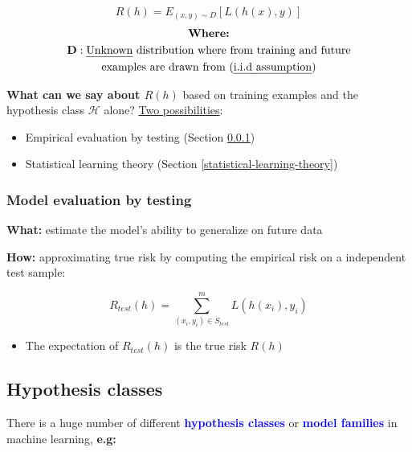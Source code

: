 \documentclass[12pt, a4paper]{article}
\begin{document}
\begin{equation} \label{eq:1}
  R(h) = E_{(x,y) \sim D}[L(h(x), y)]
\end{equation}
\begin{gather*}
  \textbf{Where:} \\
  \textbf{D}: \text{\uline{Unknown} distribution where from training and future} \\ \text{examples are drawn from (\uline{i.i.d assumption})}
\end{gather*}

\textbf{What can we say about $R(h)$} based on training examples and the
hypothesis class $\mathcal{H}$ alone? \uline{Two possibilities}:

\begin{itemize}
  \item Empirical evaluation by testing (Section \ref{model-evaluation-by-testing})
  \item Statistical learning theory (Section \ref{statistical-learning-theory})
\end{itemize}






\subsubsection{Model evaluation by testing
}\label{model-evaluation-by-testing}

\textbf{What:} estimate the model's ability to generalize on future data

\textbf{How:} approximating true risk by computing the
empirical risk on a independent test sample:

\[R_{test}(h) = \sum_{(x_i,y_i) \in S_{test}}^{m} L(h(x_i),y_i)\]

\begin{itemize}
  \item The expectation of $R_{test}(h)$ is the true risk $R(h)$
\end{itemize}




\subsection{Hypothesis classes }\label{hypothesis-classes}

There is a huge number of different \textbf{\textcolor{blue}{hypothesis classes}} or
\textbf{\textcolor{blue}{model families}} in machine learning, \textbf{e.g:}
\end{document}

